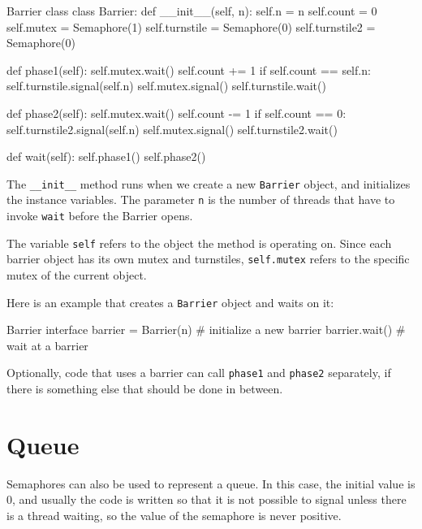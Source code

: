 \begin{lstbox}{Barrier class}
class Barrier:
    def __init__(self, n):
        self.n = n
        self.count = 0
        self.mutex = Semaphore(1)
        self.turnstile = Semaphore(0)
        self.turnstile2 = Semaphore(0)

    def phase1(self):
        self.mutex.wait()
            self.count += 1
            if self.count == self.n:
                self.turnstile.signal(self.n) 
        self.mutex.signal()
        self.turnstile.wait()            

    def phase2(self):
        self.mutex.wait()
            self.count -= 1
            if self.count == 0:
                self.turnstile2.signal(self.n)
        self.mutex.signal()
        self.turnstile2.wait()

    def wait(self):
        self.phase1()
        self.phase2()
\end{lstbox}

The {\tt \_\_init\_\_} method runs when we create a new
{\tt Barrier} object, and initializes the instance variables.
The parameter {\tt n} is the number of threads that have
to invoke {\tt wait} before the Barrier opens.

The variable {\tt self} refers to the object the method
is operating on.  Since each barrier object has its own
mutex and turnstiles, {\tt self.mutex} refers to the specific
mutex of the current object.

Here is an example that creates a {\tt Barrier}
object and waits on it:

\begin{lstbox}{Barrier interface}
barrier = Barrier(n)        # initialize a new barrier
barrier.wait()              # wait at a barrier
\end{lstbox}

Optionally, code that uses a barrier can call {\tt phase1} and
{\tt phase2} separately, if there is something else that
should be done in between.



\section{Queue}
\label{dancers}

Semaphores can also be used to represent a queue.  In this
case, the initial value is 0, and usually the code is written
so that it is not possible
to signal unless there is a thread waiting, so the value of the
semaphore is never positive.

